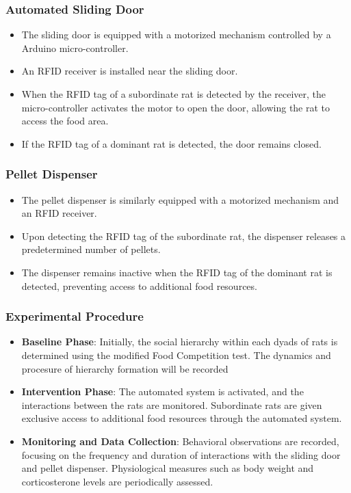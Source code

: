 \documentclass[english, a4paper, 11pt]{article}
\begin{document}
\subsubsection*{Automated Sliding Door}
\begin{itemize}
    \item The sliding door is equipped with a motorized mechanism controlled by a Arduino micro-controller.
    \item An RFID receiver is installed near the sliding door.
    \item When the RFID tag of a subordinate rat is detected by the receiver, the micro-controller activates the motor to open the door, allowing the rat to access the food area.
    \item If the RFID tag of a dominant rat is detected, the door remains closed.
\end{itemize}

\subsubsection*{Pellet Dispenser}
\begin{itemize}
    \item The pellet dispenser is similarly equipped with a motorized mechanism and an RFID receiver.
    \item Upon detecting the RFID tag of the subordinate rat, the dispenser releases a predetermined number of pellets.
    \item The dispenser remains inactive when the RFID tag of the dominant rat is detected, preventing access to additional food resources.
\end{itemize}

\subsubsection*{Experimental Procedure}
\begin{itemize}
    \item \textbf{Baseline Phase}: Initially, the social hierarchy within each dyads of rats is determined using the modified Food Competition test. The dynamics and procesure of hierarchy formation will be recorded
    \item \textbf{Intervention Phase}: The automated system is activated, and the interactions between the rats are monitored. Subordinate rats are given exclusive access to additional food resources through the automated system.
    \item \textbf{Monitoring and Data Collection}: Behavioral observations are recorded, focusing on the frequency and duration of interactions with the sliding door and pellet dispenser. Physiological measures such as body weight and corticosterone levels are periodically assessed.
\end{itemize}
\end{document}
